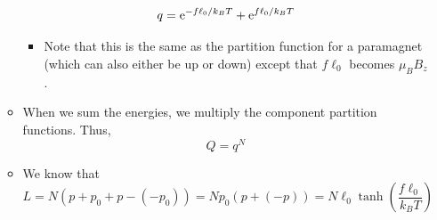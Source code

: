 \documentclass[../notes.tex]{subfiles}
\begin{document}
\begin{itemize}
\begin{itemize}
\begin{equation*}
            q = \e[-f\ell_0/k_BT]+\e[f\ell_0/k_BT]
        \end{equation*}
        \begin{itemize}
            \item Note that this is the same as the partition function for a paramagnet (which can also either be up or down) except that $f\ell_0$ becomes $\mu_BB_z$.
        \end{itemize}
        \item When we sum the energies, we multiply the component partition functions. Thus,
        \begin{equation*}
            Q = q^N
        \end{equation*}
        \item We know that
        \begin{equation*}
            L = N(p+p_0+p-(-p_0))
            = Np_0(p+(-p))
            = N\ell_0\tanh\left( \frac{f\ell_0}{k_BT} \right)
        \end{equation*}
    \end{itemize}
\end{itemize}
\end{document}

